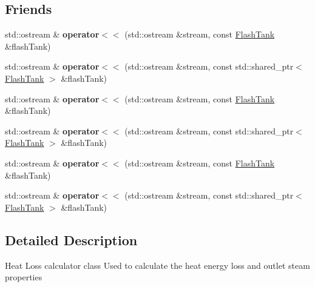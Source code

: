 \subsection*{Friends}
\begin{DoxyCompactItemize}
\item 
\mbox{\label{class_flash_tank_a50e647e19bd14ff6c6f068c258ea1916}} 
std\+::ostream \& {\bfseries operator$<$$<$} (std\+::ostream \&stream, const \hyperlink{class_flash_tank}{Flash\+Tank} \&flash\+Tank)
\item 
\mbox{\label{class_flash_tank_aa7081d666987488c7f7f54eac918b1a5}} 
std\+::ostream \& {\bfseries operator$<$$<$} (std\+::ostream \&stream, const std\+::shared\+\_\+ptr$<$ \hyperlink{class_flash_tank}{Flash\+Tank} $>$ \&flash\+Tank)
\item 
\mbox{\label{class_flash_tank_a50e647e19bd14ff6c6f068c258ea1916}} 
std\+::ostream \& {\bfseries operator$<$$<$} (std\+::ostream \&stream, const \hyperlink{class_flash_tank}{Flash\+Tank} \&flash\+Tank)
\item 
\mbox{\label{class_flash_tank_aa7081d666987488c7f7f54eac918b1a5}} 
std\+::ostream \& {\bfseries operator$<$$<$} (std\+::ostream \&stream, const std\+::shared\+\_\+ptr$<$ \hyperlink{class_flash_tank}{Flash\+Tank} $>$ \&flash\+Tank)
\item 
\mbox{\label{class_flash_tank_a50e647e19bd14ff6c6f068c258ea1916}} 
std\+::ostream \& {\bfseries operator$<$$<$} (std\+::ostream \&stream, const \hyperlink{class_flash_tank}{Flash\+Tank} \&flash\+Tank)
\item 
\mbox{\label{class_flash_tank_aa7081d666987488c7f7f54eac918b1a5}} 
std\+::ostream \& {\bfseries operator$<$$<$} (std\+::ostream \&stream, const std\+::shared\+\_\+ptr$<$ \hyperlink{class_flash_tank}{Flash\+Tank} $>$ \&flash\+Tank)
\end{DoxyCompactItemize}


\subsection{Detailed Description}
Heat Loss calculator class Used to calculate the heat energy loss and outlet steam properties 

